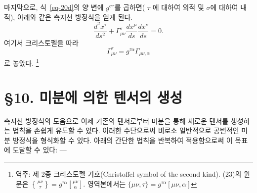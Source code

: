 \documentclass[b5paper]{article}
\begin{document}
마지막으로, 식~\eqref{eq-20d}의 양 변에 $g^{\sigma\tau}$를 곱하면(\ind{} $\tau$ 에 대하여 외적 및 \ind{} $\sigma$에 대하여 내적), 아래와 같은 측지선 방정식을 얻게 된다.
\begin{equation} \label{eq-22}
	\dfrac{d^2 x^\tau}{ds^2}+\Gamma_{\mu\nu}^\tau \dfrac{dx^\mu}{ds} \dfrac{dx^\nu}{ds}=0.
\end{equation}
여기서 크리스토펠을 따라
\begin{equation} \label{eq-23}
	\Gamma_{\mu\nu}^\tau = g^{\tau\alpha}\Gamma_{\mu\nu,\alpha}
\end{equation}
로 놓았다. \footnote{역주: 제 2종 크리스토펠 기호(Christoffel symbol of the second kind). (23)의 원문은 $\genfrac\{\}{0pt}{1}{\mu\nu}{\tau}=g^{\tau\alpha}\genfrac[]{0pt}{1}{\mu\nu}{\alpha}$. 영역본에서는 $\{\mu\nu,\tau\}=g^{\tau\alpha}[\mu\nu,\alpha]$}

\section*{\S 10. 미분에 의한 텐서의 생성}

측지선 방정식의 도움으로 이제 기존의 텐서로부터 미분을 통해 새로운 텐서를 생성하는 법칙을 손쉽게 유도할 수 있다. 이러한 수단으로써 비로소 일반적으로 공변적인 미분 방정식을 형식화할 수 있다. 아래의 간단한 법칙을 반복하여 적용함으로써 이 목표에 도달할 수 있다: ---
  
\end{document}
